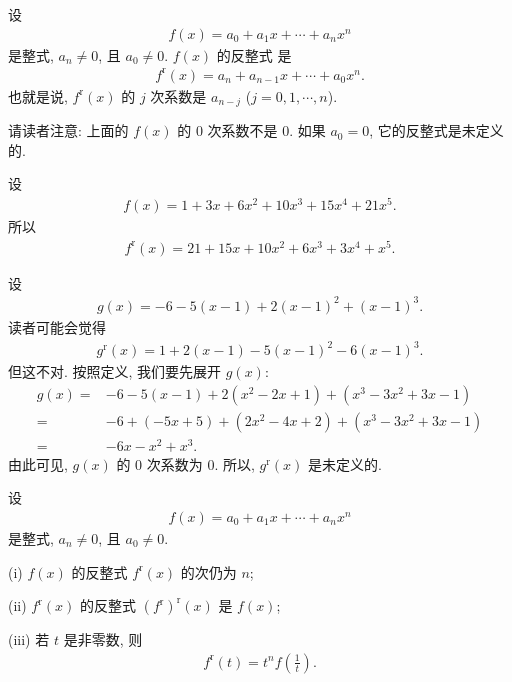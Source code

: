 \begin{definition}
    设
    \begin{align*}
        f(x) = a_0 + a_1 x + \cdots + a_n x^n
    \end{align*}
    是整式, $a_n \neq 0$, 且 $a_0 \neq 0$. $f(x)$ 的反整式  是
    \begin{align*}
        f^{\mathrm{r}} (x) = a_n + a_{n-1} x + \cdots + a_0 x^n.
    \end{align*}
    也就是说, $f^{\mathrm{r}} (x)$ 的 $j$ 次系数是 $a_{n-j}$ ($j = 0,1,\cdots,n$).

    请读者注意: 上面的 $f(x)$ 的 $0$ 次系数不是 $0$. 如果 $a_0 = 0$, 它的反整式是未定义的.
\end{definition}

\begin{example}
    设
    \begin{align*}
        f(x) = 1 + 3x + 6x^2 + 10x^3 + 15x^4 + 21x^5.
    \end{align*}
    所以
    \begin{align*}
        f^{\mathrm{r}} (x) = 21 + 15x + 10x^2 + 6x^3 + 3x^4 + x^5.
    \end{align*}
\end{example}

\begin{example}
    设
    \begin{align*}
        g(x) = -6 - 5 (x - 1) + 2 (x - 1)^2 + (x - 1)^3.
    \end{align*}
    读者可能会觉得
    \begin{align*}
        g^{\mathrm{r}} (x) = 1 + 2 (x - 1) - 5 (x - 1)^2 - 6 (x - 1)^3.
    \end{align*}
    但这不对. 按照定义, 我们要先展开 $g(x)$:
    \begin{align*}
        g(x)
        = {} & -6 - 5(x - 1) + 2 (x^2 - 2x + 1) + (x^3 - 3x^2 + 3x - 1) \\
        = {} & -6 + (-5x + 5) + (2x^2 - 4x + 2) + (x^3 - 3x^2 + 3x - 1) \\
        = {} & -6x - x^2 + x^3.
    \end{align*}
    由此可见, $g(x)$ 的 $0$ 次系数为 $0$. 所以, $g^{\mathrm{r}} (x)$ 是未定义的.
\end{example}

\begin{proposition}
    设
    \begin{align*}
        f(x) = a_0 + a_1 x + \cdots + a_n x^n
    \end{align*}
    是整式, $a_n \neq 0$, 且 $a_0 \neq 0$.

    (i) $f(x)$ 的反整式 $f^{\mathrm{r}} (x)$ 的次仍为 $n$;

    (ii) $f^{\mathrm{r}}(x)$ 的反整式 $(f^{\mathrm{r}})^{\mathrm{r}} (x)$ 是 $f(x)$;

    (iii) 若 $t$ 是非零数, 则
    \begin{align*}
        f^{\mathrm{r}} (t) = t^n f \left( \frac{1}{t} \right).
    \end{align*}
\end{proposition}

